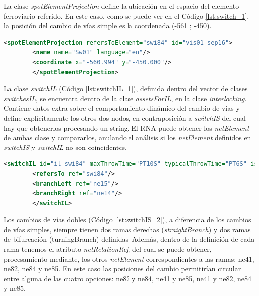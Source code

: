     La clase \textit{spotElementProjection} define la ubicación en el espacio del elemento ferroviario referido. En este caso, como se puede ver en el Código \ref{lst:switch_1}, la posición del cambio de vías simple es la coordenada (-561 ; -450).
    
    \begin{lstlisting}[language = XML, caption = Clase \textit{spotElementProjection} (ordinarySwitch) , label = {lst:switch_1}]
    	<spotElementProjection refersToElement="swi84" id="vis01_sep16">
    	<name name="Sw01" language="en"/>
    	<coordinate x="-560.994" y="-450.000"/>
    	</spotElementProjection>
    \end{lstlisting}
    
    La clase \textit{switchIL} (Código \ref{lst:switchIL_1}), definida dentro del vector de clases \textit{switchesIL}, se encuentra dentro de la clase \textit{assetsForIL}, en la clase \textit{interlocking}. Contiene datos extra sobre el comportamiento dinámico del cambio de vías y define explícitamente los otros dos nodos, en contraposición a \textit{switchIS} del cual hay que obtenerlos procesando un string. El RNA puede obtener los \textit{netElement} de ambas clase y compararlos, anulando el análisis si los \textit{netElement} definidos en \textit{switchIS} y \textit{switchIL} no son coincidentes.
    
    \begin{lstlisting}[language = XML, caption = Clase \textit{SwitchIL} (ordinarySwitch) , label = {lst:switchIL_1}]
    	<switchIL id="il_swi84" maxThrowTime="PT10S" typicalThrowTime="PT6S" isKeyLocked="false" returnsToPreferredPosition="false">
    	<refersTo ref="swi84"/>
    	<branchLeft ref="ne15"/>
    	<branchRight ref="ne14"/>
    	</switchIL>
    \end{lstlisting}    
    
    Los cambios de vías dobles (Código \ref{lst:switchIS_2}), a diferencia de los cambios de vías simples, siempre tienen dos ramas derechas (\textit{straightBranch}) y dos ramas de bifurcación (turningBranch) definidas. Además, dentro de la definición de cada rama tenemos el atributo \textit{netRelationRef}, del cual se puede obtener, procesamiento mediante, los otros \textit{netElement} correspondientes a las ramas: ne41, ne82, ne84 y ne85. En este caso las posiciones del cambio permitirían circular entre alguna de las cuatro opciones: ne82 y ne84, ne41 y ne85, ne41 y ne82, ne84 y ne85.
    
